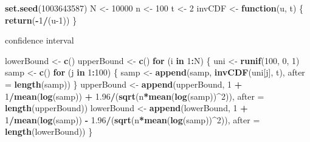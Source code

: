 \documentclass[
]{article}
\newenvironment{Shaded}{\begin{snugshade}}{\end{snugshade}}
\newcommand{\ControlFlowTok}[1]{\textcolor[rgb]{0.13,0.29,0.53}{\textbf{#1}}}
\newcommand{\DataTypeTok}[1]{\textcolor[rgb]{0.13,0.29,0.53}{#1}}
\newcommand{\DecValTok}[1]{\textcolor[rgb]{0.00,0.00,0.81}{#1}}
\newcommand{\FloatTok}[1]{\textcolor[rgb]{0.00,0.00,0.81}{#1}}
\newcommand{\KeywordTok}[1]{\textcolor[rgb]{0.13,0.29,0.53}{\textbf{#1}}}
\newcommand{\NormalTok}[1]{#1}
\newcommand{\OperatorTok}[1]{\textcolor[rgb]{0.81,0.36,0.00}{\textbf{#1}}}
\newcommand{\StringTok}[1]{\textcolor[rgb]{0.31,0.60,0.02}{#1}}
\begin{document}
\begin{Shaded}
\begin{Highlighting}[]
\KeywordTok{set.seed}\NormalTok{(}\DecValTok{1003643587}\NormalTok{)}
\NormalTok{N <-}\StringTok{ }\DecValTok{10000}
\NormalTok{n <-}\StringTok{ }\DecValTok{100}
\NormalTok{t <-}\StringTok{ }\DecValTok{2}
\NormalTok{invCDF <-}\StringTok{ }\ControlFlowTok{function}\NormalTok{(u, t) \{}
  \KeywordTok{return}\NormalTok{(}\OperatorTok{-}\DecValTok{1}\OperatorTok{/}\NormalTok{(u}\DecValTok{-1}\NormalTok{))}
\NormalTok{\}}
\end{Highlighting}
\end{Shaded}

confidence interval

\begin{Shaded}
\begin{Highlighting}[]
\NormalTok{lowerBound <-}\StringTok{ }\KeywordTok{c}\NormalTok{()}
\NormalTok{upperBound <-}\StringTok{ }\KeywordTok{c}\NormalTok{()}
\ControlFlowTok{for}\NormalTok{ (i }\ControlFlowTok{in} \DecValTok{1}\OperatorTok{:}\NormalTok{N) \{}
\NormalTok{  uni <-}\StringTok{ }\KeywordTok{runif}\NormalTok{(}\DecValTok{100}\NormalTok{, }\DecValTok{0}\NormalTok{, }\DecValTok{1}\NormalTok{)}
\NormalTok{  samp <-}\StringTok{ }\KeywordTok{c}\NormalTok{()}
  \ControlFlowTok{for}\NormalTok{ (j }\ControlFlowTok{in} \DecValTok{1}\OperatorTok{:}\DecValTok{100}\NormalTok{) \{}
\NormalTok{    samp <-}\StringTok{ }\KeywordTok{append}\NormalTok{(samp, }\KeywordTok{invCDF}\NormalTok{(uni[j], t), }\DataTypeTok{after =} \KeywordTok{length}\NormalTok{(samp))}
\NormalTok{  \}}
\NormalTok{  upperBound <-}\StringTok{ }\KeywordTok{append}\NormalTok{(upperBound, }\DecValTok{1} \OperatorTok{+}\StringTok{ }\DecValTok{1}\OperatorTok{/}\KeywordTok{mean}\NormalTok{(}\KeywordTok{log}\NormalTok{(samp)) }\OperatorTok{+}\StringTok{ }\FloatTok{1.96}\OperatorTok{/}\NormalTok{(}\KeywordTok{sqrt}\NormalTok{(n}\OperatorTok{*}\KeywordTok{mean}\NormalTok{(}\KeywordTok{log}\NormalTok{(samp))}\OperatorTok{^}\DecValTok{2}\NormalTok{)), }\DataTypeTok{after =} \KeywordTok{length}\NormalTok{(upperBound))}
\NormalTok{  lowerBound <-}\StringTok{ }\KeywordTok{append}\NormalTok{(lowerBound, }\DecValTok{1} \OperatorTok{+}\StringTok{ }\DecValTok{1}\OperatorTok{/}\KeywordTok{mean}\NormalTok{(}\KeywordTok{log}\NormalTok{(samp)) }\OperatorTok{-}\StringTok{ }\FloatTok{1.96}\OperatorTok{/}\NormalTok{(}\KeywordTok{sqrt}\NormalTok{(n}\OperatorTok{*}\KeywordTok{mean}\NormalTok{(}\KeywordTok{log}\NormalTok{(samp))}\OperatorTok{^}\DecValTok{2}\NormalTok{)), }\DataTypeTok{after =} \KeywordTok{length}\NormalTok{(lowerBound))}
\NormalTok{\}}
\end{Highlighting}
\end{Shaded}
\end{document}
